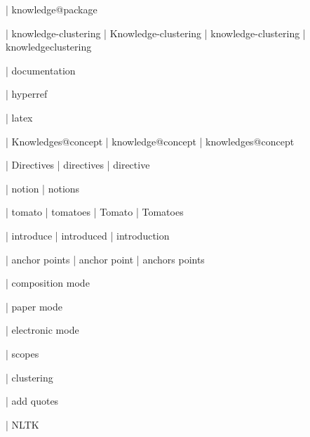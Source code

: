  | knowledge@package

 | knowledge-clustering
 | Knowledge-clustering
 | knowledge-cluste\-ring
 | knowledge\-clustering

 | documentation

 | hyperref

 | latex

 | Knowledges@concept
 | knowledge@concept
 | knowledges@concept

 | Directives
 | directives
 | directive

 | notion
 | notions

 | tomato
 | tomatoes
 | Tomato
 | Tomatoes

 | introduce
 | introduced
 | introduction

 | anchor points
 | anchor point
 | anchors points

 | composition mode

 | paper mode

 | electronic mode

 | scopes

 | clustering

 | add quotes

 | NLTK
